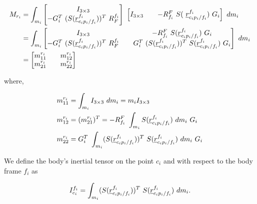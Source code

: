 \begin{align*}
M_{r_i} & = \int_{m_i} \begin{bmatrix}
    I_{3 \times 3} \\ -G^{T}_{i}\ (S(\pvec{r}{c_{i}p_{i}}{f_i}{f_i}))^{T}\ \rot{R}{F}{f_i}         
    \end{bmatrix}\ \begin{bmatrix}
    I_{3 \times 3} && -\rot{R}{f_{i}}{F} \ S( \ \pvec{r}{c_{i}p_{i}}{f_i}{f_i})\ G_{i}         
    \end{bmatrix}\ dm_{i} \\ 
    & = \int_{m_i} 
    \begin{bmatrix}
    I_{3 \times 3} && -\rot{R}{f_{i}}{F}\ S(\pvec{r}{c_{i}p_{i}}{f_i}{f_i})\ G_{i}
    \\ -G^{T}_{i}\ (S(\pvec{r}{c_{i}p_{i}}{f_i}{f_i}))^{T}\ \rot{R}{F}{f_i} && 
    G^{T}_{i}\ (S(\pvec{r}{c_{i}p_{i}}{f_i}{f_i}))^{T}\ S(\pvec{r}{c_{i}p_{i}}{f_i}{f_i})\ G_{i}        
    \end{bmatrix}\ dm_{i} \\ 
    & = \begin{bmatrix}
        m^{r_i}_{11} && m^{r_i}_{12} \\ m^{r_i}_{21} && m^{r_i}_{22}
    \end{bmatrix}
\end{align*}

where,

\begin{subequations}
\begin{align}
    m^{r_i}_{11} &= \int_{m_i} I_{3 \times 3}\ dm_{i} =  m_{i} I_{3 \times 3} \\
    m^{r_i}_{12} &= (m^{r_i}_{21})^{T} = -\rot{R}{f_{i}}{F}\ \int_{m_i} S(\pvec{r}{c_{i}p_{i}}{f_i}{f_i})\ dm_{i}\ G_{i}\\ 
    m^{r_i}_{22} &= G^{T}_{i}\ \int_{m_i} (S(\pvec{r}{c_{i}p_{i}}{f_i}{f_i}))^{T}\ S(\pvec{r}{c_{i}p_{i}}{f_i}{f_i})\ dm_{i}\ G_{i}
\end{align}
    \label{eq:mass_matrix_components_rigid_body}
\end{subequations}

We define the body's inertial tensor on the point $c_i$ and with respect to 
the body frame $f_i$ as 

\begin{equation}
    I_{c_i}^{f_i} = \int_{m_i} (S(\pvec{r}{c_{i}p_{i}}{f_i}{f_i}))^{T}\ S(\pvec{r}{c_{i}p_{i}}{f_i}{f_i})\ dm_i .
    \label{eq:inertial_tensor_rigid_body}
\end{equation}

